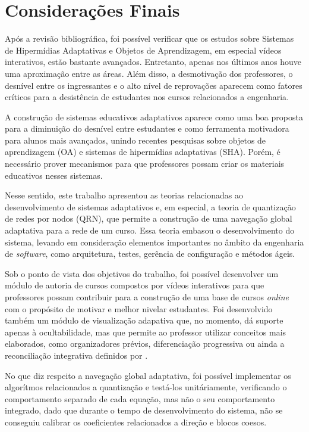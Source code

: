 \chapter[Considerações Finais]{Considerações Finais}

Após a revisão bibliográfica, foi possível verificar que os estudos sobre Sistemas de Hipermídias Adaptativas e Objetos de Aprendizagem, em especial vídeos interativos, estão bastante avançados. Entretanto, apenas nos últimos anos houve uma aproximação entre as áreas. Além disso, a desmotivação dos professores, o desnível entre os ingressantes e o alto nível de reprovações aparecem como fatores críticos para a desistência de estudantes nos cursos relacionados a engenharia\cite{silva2005}. 

A construção de sistemas educativos adaptativos aparece como uma boa proposta para a diminuição do desnível entre estudantes e como ferramenta motivadora para alunos mais avançados, unindo recentes pesquisas sobre objetos de aprendizagem (OA) e sistemas de hipermídias adaptativas (SHA). Porém, é necessário prover mecanismos para que professores possam criar os materiais educativos nesses sistemas.

Nesse sentido, este trabalho apresentou as teorias relacionadas ao desenvolvimento de sistemas adaptativos e, em especial, a teoria de quantização de redes por nodos (QRN), que permite a construção de uma navegação global adaptativa para a rede de um curso. Essa teoria embasou o desenvolvimento do sistema, levando em consideração elementos importantes no âmbito da engenharia de \textit{software}, como arquitetura, testes, gerência de configuração e métodos ágeis. 

Sob o ponto de vista dos objetivos do trabalho, foi possível desenvolver um módulo de autoria de cursos compostos por vídeos interativos para que professores possam contribuir para a construção de uma base de cursos \textit{online} com o propósito de motivar e melhor nivelar estudantes. Foi desenvolvido também um módulo de visualização adapativa que, no momento, dá suporte apenas à ocultabilidade, mas que permite ao professor utilizar conceitos mais elaborados, como organizadores prévios, diferenciação progressiva ou ainda a reconciliação integrativa definidos por .

No que diz respeito a navegação global adaptativa, foi possível implementar os algorítmos relacionados a quantização e testá-los unitáriamente, verificando o comportamento separado de cada equação, mas não o seu comportamento integrado, dado que durante o tempo de desenvolvimento do sistema, não se conseguiu calibrar os coeficientes relacionados a direção e blocos coesos.

